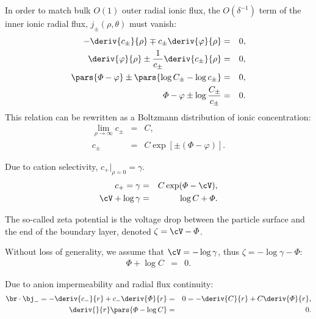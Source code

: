 In order to match bulk $O(1)$ outer radial ionic flux, 
the $O(\delta^{-1})$ term of the inner ionic radial flux, $j_\pm(\rho, \theta)$ must vanish:
\begin{eqnarray*}
  -\deriv{c_\pm}{\rho} \mp c_\pm \deriv{\varphi}{\rho} &=& 0, \\
  \deriv{\varphi}{\rho} \pm\frac{1}{c_\pm}\deriv{c_\pm}{\rho} &=& 0, \\
  \pars{\varPhi - \varphi} \pm\pars{\log C_\pm - \log c_\pm} &=& 0, \\
  \varPhi - \varphi \pm \log \frac{C_\pm}{c_\pm} &=& 0.
\end{eqnarray*}
This relation can be rewritten as a Boltzmann distribution of ionic concentration:
\begin{eqnarray*}
\lim_{\rho\rightarrow\infty} c_\pm &=& C, \\
c_\pm &=& C \exp\left[\pm(\varPhi - \varphi)\right].
\end{eqnarray*}

Due to cation selectivity, $c_+|_{\rho=0} = \gamma$.
\begin{eqnarray*}
  c_+ = \gamma &=& C \exp(\varPhi - \cV), \\
  \cV + \log \gamma &=& \log C + \varPhi.
\end{eqnarray*}

The so-called zeta potential is 
the voltage drop between the particle surface and the end of
the boundary layer, denoted $\zeta = \cV - \varPhi$. 

Without loss of generality, 
we assume that $\cV = -\log\gamma$, thus $\zeta = -\log\gamma-\varPhi$:
\begin{eqnarray*} 
\varPhi + \log C &=& 0.
\end{eqnarray*}

Due to anion impermeability and radial flux continuity:
\begin{eqnarray*}
  \br \cdot \bj_- = -\deriv{c_-}{r} + c_- \deriv{\varPhi}{r} 
  &=& 0 = -\deriv{C}{r} + C \deriv{\varPhi}{r}, \\
\deriv{}{r}\pars{\varPhi - \log C} &=& 0.
\end{eqnarray*}

